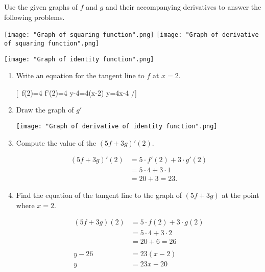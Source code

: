 \documentclass[nooutcomes]{ximera}
\begin{document}
\begin{problem}

  Use the given graphs of $f$ and $g$ and their accompanying derivatives to answer the following problems.
  \begin{image}
    \hspace*{-7em}
     \texttt{[image: "Graph of squaring function".png]}
     \hspace{2em}
     \texttt{[image: "Graph of derivative of squaring function".png]}
   \end{image}
   \begin{image}
     \texttt{[image: "Graph of identity function".png]}
   \end{image}

   \begin{enumerate}
     \item
	Write an equation for the tangent line to $f$ at $x=2$.

	\begin{freeResponse} \hfil
	[\
		f(2)=4
		f'(2)=4
		y-4=4(x-2)
		y=4x-4
	/]
	\end{freeResponse}

	\item Draw the graph of $g'$
		\begin{freeResponse}
	   \begin{image}
     \texttt{[image: "Graph of derivative of identity function".png]}
   \end{image}	
		\end{freeResponse}
       \item Compute the value of the $(5f+3g)'(2)$.

       \begin{freeResponse}
         \begin{align*}
           (5f+3g)'(2) &= 5\cdot f'(2) + 3 \cdot g'(2)\\
                       &= 5 \cdot 4 + 3 \cdot 1 \\
                       &= 20 + 3 = 23.
         \end{align*}
       \end{freeResponse}

	\item Find the equation of the tangent line to the graph of $(5f+3g)$ at the point where $x=2$.

	\begin{freeResponse}
         \begin{align*}
           (5f+3g)(2) &= 5\cdot f(2) + 3 \cdot g(2)\\
                       &= 5 \cdot 4 + 3 \cdot 2 \\
                       &= 20 + 6 = 26\\\\
	y-26 &=23(x-2)\\
	y&=23x-20
         \end{align*}
	\end{freeResponse}


\end{enumerate}
\end{problem}
\end{document}
